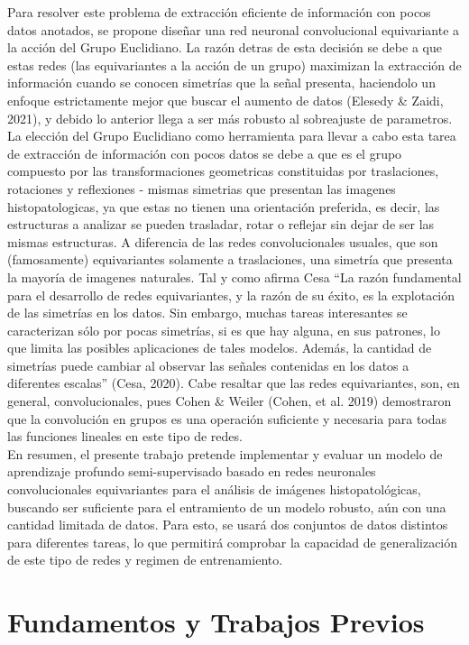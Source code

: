 \documentclass[12pt,letterpaper,final, openany]{scrbook}
\begin{document}
Para resolver este problema de extracción eficiente de información con pocos datos anotados, se propone diseñar una red neuronal convolucional equivariante a la acción del Grupo Euclidiano. La razón detras de esta decisión se debe a que estas redes (las equivariantes a la acción de un grupo) maximizan la extracción de información cuando se conocen simetrías que la señal presenta, haciendolo un enfoque estrictamente mejor que buscar el aumento de datos (Elesedy \& Zaidi, 2021), y debido lo anterior llega a ser más robusto al sobreajuste de parametros. La elección del Grupo Euclidiano como herramienta para llevar a cabo esta tarea de extracción de información con pocos datos se debe a que es el grupo compuesto por las transformaciones geometricas constituidas por traslaciones, rotaciones y reflexiones - mismas simetrias que presentan las imagenes histopatologicas, ya que estas no tienen una orientación preferida, es decir, las estructuras a analizar se pueden trasladar, rotar o reflejar sin dejar de ser las mismas estructuras. A diferencia de las redes convolucionales usuales, que son (famosamente) equivariantes solamente a traslaciones, una simetría que presenta la mayoría de imagenes naturales. Tal y como afirma Cesa ``La razón fundamental para el desarrollo de redes equivariantes, y la razón de su éxito, es la explotación de las simetrías en los datos. Sin embargo, muchas tareas interesantes se caracterizan sólo por pocas simetrías, si es que hay alguna, en sus patrones, lo que limita las posibles aplicaciones de tales modelos. Además, la cantidad de simetrías puede cambiar al observar las señales contenidas en los datos a diferentes escalas” (Cesa, 2020). Cabe resaltar que las redes equivariantes, son, en general, convolucionales, pues Cohen \& Weiler (Cohen, et al. 2019) demostraron que la convolución en grupos es una operación suficiente y necesaria para todas las funciones lineales en este tipo de redes.
\\
En resumen, el presente trabajo pretende implementar y evaluar un modelo de aprendizaje profundo semi-supervisado basado en redes neuronales convolucionales equivariantes para el análisis de imágenes histopatológicas, buscando ser suficiente para el entramiento de un modelo robusto, aún con una cantidad limitada de datos. Para esto, se usará dos conjuntos de datos distintos para diferentes tareas, lo que permitirá comprobar la capacidad de generalización de este tipo de redes y regimen de entrenamiento.
\newpage
\chapter{Fundamentos y Trabajos Previos}
\end{document}
